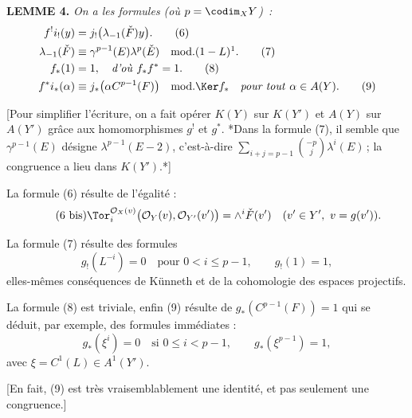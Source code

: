\textbf{LEMME 4.} \emph{On a les formules (où \(p=\codim_XY\))~:}
\begin{align}
  f^!i_!(y)&=j_!\bigl(\lambda_{-1}(\check F)y\bigr). \tag{6}\\
  \lambda_{-1}(\check F)&\equiv \gamma^{p-1}(E)\lambda^p(\check E)
    \quad\text{mod.}(1-L)\footnotemark. \tag{7}\\
  f_*(1)&=1,\quad\text{\emph{d'où} }f_*f^*=1. \tag{8}\\
  f^*i_*(\alpha)&\equiv j_*\bigl(\alpha C^{p-1}(F)\bigr)
    \quad\text{mod.}\Ker f_*\quad\text{\emph{pour tout} }\alpha\in A(Y). \tag{9}
\end{align}

[Pour simplifier l'écriture, on a fait opérer \(K(Y)\) sur \(K(Y')\) et \(A(Y)\) sur \(A(Y')\) grâce aux homomorphismes \(g^!\) et \(g^*\). {*}Dans la formule (7), il semble que \(\gamma^{p-1}(E)\) désigne \(\lambda^{p-1}(E-2)\), c'est-à-dire \(\sum_{i+j=p-1}\binom{-p}{j}\lambda^i(E)\)\,; la congruence a lieu dans \(K(Y')\).{*}]

La formule (6) résulte de l'égalité :
\begin{equation}\tag{6 bis}
  \Tor_i^{\mathcal O_X(v)}\bigl(\mathcal O_Y(v),\mathcal O_{Y'}(v')\bigr)
  =
  \wedge^i\check F(v')
  \quad (v'\in Y',\ v=g(v')).
\end{equation}

La formule (7) résulte des formules
\begin{equation}\tag{10}
  g_!(L^{-i})=0\quad\text{pour }0<i\leq p-1,\qquad g_!(1)=1,
\end{equation}
elles-mêmes conséquences de Künneth et de la cohomologie des espaces projectifs.

La formule (8) est triviale, enfin (9) résulte de \(g_*(C^{p-1}(F))=1\) qui se déduit, par exemple, des formules immédiates :
\begin{equation}\tag{10 bis}
  g_*(\xi^i)=0\quad\text{si }0\leq i<p-1,\qquad
  g_*(\xi^{p-1})=1,
\end{equation}
avec \(\xi=C^1(L)\in A^1(Y')\).

[En fait, (9) est très vraisemblablement une identité, et pas seulement une congruence.]


